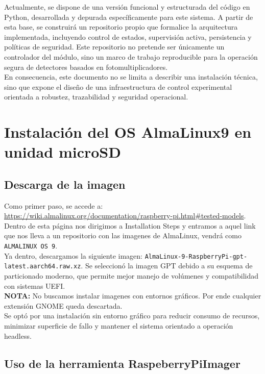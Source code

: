 \documentclass{article}
\begin{document}
Actualmente, se dispone de una versión funcional y estructurada del código en Python, desarrollada y depurada específicamente para este sistema. A partir de esta base, se construirá un repositorio propio que formalice la arquitectura implementada, incluyendo control de estados, supervisión activa, persistencia y políticas de seguridad. Este repositorio no pretende ser únicamente un controlador del módulo, sino un marco de trabajo reproducible para la operación segura de detectores basados en fotomultiplicadores.\\

En consecuencia, este documento no se limita a describir una instalación técnica, sino que expone el diseño de una infraestructura de control experimental orientada a robustez, trazabilidad y seguridad operacional.\\



\section{Instalación del OS AlmaLinux9 en unidad microSD}
\subsection{Descarga de la imagen}
Como primer paso, se accede a: \url{https://wiki.almalinux.org/documentation/raspberry-pi.html#tested-models}. Dentro de esta página nos dirigimos a Installation Steps y entramos a aquel link que nos lleva a un repositorio con las imagenes de AlmaLinux, vendrá como \texttt{ALMALINUX OS 9}.\\

Ya dentro, descargamos la siguiente imagen: \newline
\texttt{AlmaLinux-9-RaspberryPi-gpt-latest.aarch64.raw.xz}. Se seleccionó la imagen GPT debido a su esquema de particionado moderno, que permite mejor manejo de volúmenes y compatibilidad con sistemas UEFI. \\

\textbf{NOTA:} No buscamos instalar imagenes con entornos gráficos. Por ende cualquier extensión GNOME queda descartada.\\

Se optó por una instalación sin entorno gráfico para reducir consumo de recursos, minimizar superficie de fallo y mantener el sistema orientado a operación headless.\\


\subsection{Uso de la herramienta RaspeberryPiImager}
\end{document}
